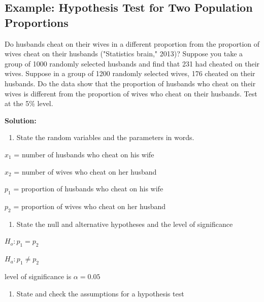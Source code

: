 \documentclass[
]{book}
\providecommand{\tightlist}{%
  \setlength{\itemsep}{0pt}\setlength{\parskip}{0pt}}
\begin{document}
\hypertarget{example-hypothesis-test-for-two-population-proportions}{%
\subsection{Example: Hypothesis Test for Two Population Proportions}\label{example-hypothesis-test-for-two-population-proportions}}

Do husbands cheat on their wives in a different proportion from the proportion of wives cheat on their husbands ("Statistics brain," 2013)? Suppose you take a group of 1000 randomly selected husbands and find that 231 had cheated on their wives. Suppose in a group of 1200 randomly selected wives, 176 cheated on their husbands. Do the data show that the proportion of husbands who cheat on their wives is different from the proportion of wives who cheat on their husbands. Test at the 5\% level.

\textbf{Solution:}

\begin{enumerate}
\def\labelenumi{\arabic{enumi}.}
\tightlist
\item
  State the random variables and the parameters in words.
\end{enumerate}

\(x_1\) = number of husbands who cheat on his wife

\(x_2\) = number of wives who cheat on her husband

\(p_1\) = proportion of husbands who cheat on his wife

\(p_2\) = proportion of wives who cheat on her husband

\begin{enumerate}
\def\labelenumi{\arabic{enumi}.}
\setcounter{enumi}{1}
\tightlist
\item
  State the null and alternative hypotheses and the level of significance
\end{enumerate}

\(H_o: p_1=p_2\)

\(H_a: p_1\ne p_2\)

level of significance is \(\alpha=0.05\)

\begin{enumerate}
\def\labelenumi{\arabic{enumi}.}
\setcounter{enumi}{2}
\tightlist
\item
  State and check the assumptions for a hypothesis test
\end{enumerate}
\end{document}
